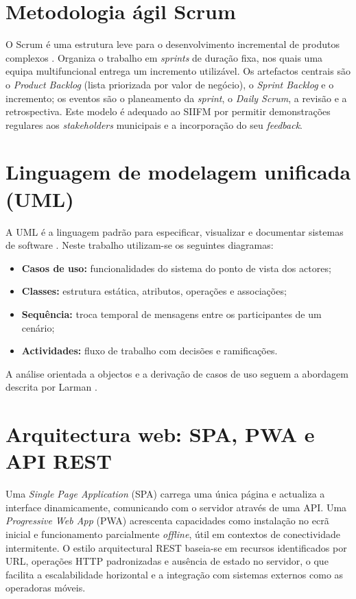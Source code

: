 \documentclass[12pt,a4paper,openany]{report}
\begin{document}
\section{Metodologia ágil Scrum}
O Scrum é uma estrutura leve para o desenvolvimento incremental de produtos complexos \cite{scrum2020}. Organiza o trabalho em \emph{sprints} de duração fixa, nos quais uma equipa multifuncional entrega um incremento utilizável. Os artefactos centrais são o \emph{Product Backlog} (lista priorizada por valor de negócio), o \emph{Sprint Backlog} e o incremento; os eventos são o planeamento da \emph{sprint}, o \emph{Daily Scrum}, a revisão e a retrospectiva. Este modelo é adequado ao SIIFM por permitir demonstrações regulares aos \emph{stakeholders} municipais e a incorporação do seu \emph{feedback}.

\section{Linguagem de modelagem unificada (UML)}
A UML é a linguagem padrão para especificar, visualizar e documentar sistemas de software \cite{booch2005,fowler2004}. Neste trabalho utilizam-se os seguintes diagramas:
\begin{itemize}
\item \textbf{Casos de uso:} funcionalidades do sistema do ponto de vista dos actores;
\item \textbf{Classes:} estrutura estática, atributos, operações e associações;
\item \textbf{Sequência:} troca temporal de mensagens entre os participantes de um cenário;
\item \textbf{Actividades:} fluxo de trabalho com decisões e ramificações.
\end{itemize}
A análise orientada a objectos e a derivação de casos de uso seguem a abordagem descrita por Larman \cite{larman2004}.

\section{Arquitectura web: SPA, PWA e API REST}
Uma \emph{Single Page Application} (SPA) carrega uma única página e actualiza a interface dinamicamente, comunicando com o servidor através de uma API. Uma \emph{Progressive Web App} (PWA) acrescenta capacidades como instalação no ecrã inicial e funcionamento parcialmente \emph{offline}, útil em contextos de conectividade intermitente. O estilo arquitectural REST \cite{fielding2000} baseia-se em recursos identificados por URL, operações HTTP padronizadas e ausência de estado no servidor, o que facilita a escalabilidade horizontal e a integração com sistemas externos como as operadoras móveis.
\end{document}
